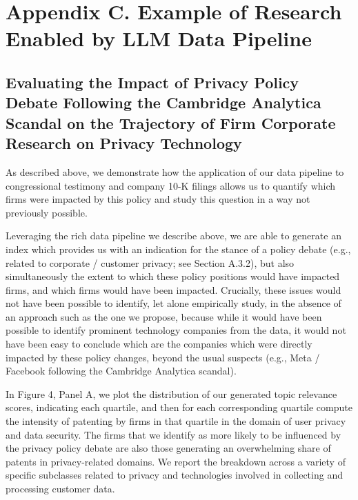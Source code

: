 \documentclass[11pt]{article}
\begin{document}

\clearpage
\section*{Appendix C. Example of Research Enabled by LLM Data Pipeline}

\subsection*{Evaluating the Impact of Privacy Policy Debate Following the Cambridge Analytica Scandal on the Trajectory of Firm Corporate Research on Privacy Technology}

As described above, we demonstrate how the application of our data pipeline to congressional testimony and company 10-K filings allows us to quantify which firms were impacted by this policy and study this question in a way not previously possible.

Leveraging the rich data pipeline we describe above, we are able to generate an index which provides us with an indication for the stance of a policy debate (e.g., related to corporate / customer privacy; see Section A.3.2), but also simultaneously the extent to which these policy positions would have impacted firms, and which firms would have been impacted. Crucially, these issues would not have been possible to identify, let alone empirically study, in the absence of an approach such as the one we propose, because while it would have been possible to identify prominent technology companies from the data, it would not have been easy to conclude which are the companies which were directly impacted by these policy changes, beyond the usual suspects (e.g., Meta / Facebook following the Cambridge Analytica scandal).

In Figure 4, Panel A, we plot the distribution of our generated topic relevance scores, indicating each quartile, and then for each corresponding quartile compute the intensity of patenting by firms in that quartile in the domain of user privacy and data security. The firms that we identify as more likely to be influenced by the privacy policy debate are also those generating an overwhelming share of patents in privacy-related domains. We report the breakdown across a variety of specific subclasses related to privacy and technologies involved in collecting and processing customer data.
\end{document}
